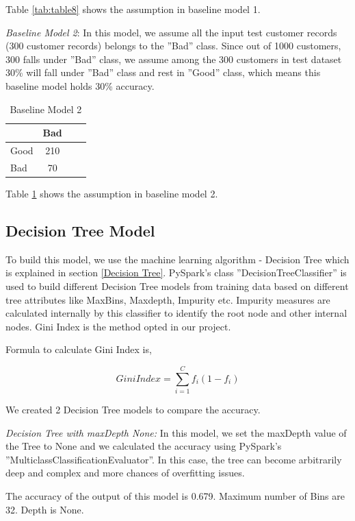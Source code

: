\documentclass[sigconf]{acmart}
\begin{document}
Table \ref{tab:table8} shows the assumption in baseline model 1.

\textit{Baseline Model 2}: In this model, we assume all the input test customer records (300 customer records) belongs to the ''Bad'' class. Since out of 1000 customers, 300 falls under ''Bad'' class, we assume among the 300 customers in test dataset 30\% will fall under ''Bad'' class and rest in ''Good'' class, which means this baseline model holds 30\% accuracy. 

\begin{table}
  \caption{Baseline Model 2}
  \label{tab:table9}
  \begin{tabular}{lclc}
    \toprule
     & Bad\\
    \midrule
    Good& 210\\
    Bad& 70\\
    \bottomrule
  \end{tabular}
\end{table}

Table \ref{tab:table9} shows the assumption in baseline model 2.

\subsection{Decision Tree Model}

To build this model, we use the machine learning algorithm - Decision Tree which is explained in section \ref{Decision Tree}. PySpark's class ''DecisionTreeClassifier'' is used to build different Decision Tree models from training data based on different tree attributes like MaxBins, Maxdepth, Impurity etc. Impurity measures are calculated internally by this classifier to identify the root node and other internal nodes. Gini Index is the method opted in our project.

Formula to calculate Gini Index is,

\begin{equation}
Gini Index = \sum_{i=1}^Cf_i(1-{f_i})
\end{equation}

We created 2 Decision Tree models to compare the accuracy.

\textit{Decision Tree with maxDepth None:} In this model, we set the maxDepth value of the Tree to None and we calculated the accuracy using PySpark's ''MulticlassClassificationEvaluator''. In this case, the tree can become arbitrarily deep and complex and more chances of overfitting issues.

The accuracy of the output of this model is 0.679. Maximum number of Bins are 32. Depth is None.
\end{document}
